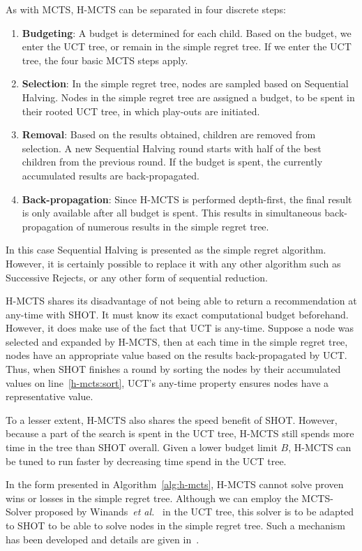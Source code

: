 \documentclass[a4paper]{llncs}
\begin{document}
As with MCTS, H-MCTS can be separated in four discrete steps:
\begin{enumerate}
\item \textbf{Budgeting}: A budget is determined for each child. Based on the budget, we enter the UCT tree, or remain in the simple regret tree. If we enter the UCT tree, the four basic MCTS steps apply.
\item \textbf{Selection}: In the simple regret tree, nodes are sampled based on Sequential Halving. Nodes in the simple regret tree are assigned a budget, to be spent in their rooted UCT tree, in which play-outs are initiated.
\item \textbf{Removal}: Based on the results obtained, children are removed from selection. A new Sequential Halving round starts with half of the best children from the previous round. If the budget is spent, the currently accumulated results are back-propagated.
\item \textbf{Back-propagation}: Since H-MCTS is performed depth-first, the final result is only available after all budget is spent. This results in simultaneous back-propagation of numerous results in the simple regret tree.
\end{enumerate}
In this case Sequential Halving is presented as the simple regret algorithm. However, it is certainly possible to replace it with any other algorithm such as Successive Rejects, or any other form of sequential reduction.

H-MCTS shares its disadvantage of not being able to return a recommendation at any-time with SHOT. It must know its exact computational budget beforehand. However, it does make use of the fact that UCT is any-time. Suppose a node was selected and expanded by H-MCTS, then at each time in the simple regret tree, nodes have an appropriate value based on the results back-propagated by UCT. Thus, when SHOT finishes a round by sorting the nodes by their accumulated values on line~\ref{h-mcts:sort}, UCT's any-time property ensures nodes have a representative value.

To a lesser extent, H-MCTS also shares the speed benefit of SHOT. However, because a part of the search is spent in the UCT tree, H-MCTS still spends more time in the tree than SHOT overall. Given a lower budget limit $B$, H-MCTS can be tuned to run faster by decreasing time spend in the UCT tree.

In the form presented in Algorithm~\ref{alg:h-mcts}, H-MCTS cannot solve proven wins or losses in the simple regret tree. Although we can employ the MCTS-Solver proposed by Winands~\emph{et al.}~\cite{Winands2008} in the UCT tree, this solver is to be adapted to SHOT to be able to solve nodes in the simple regret tree. Such a mechanism has been developed and details are given in~\cite{pepels14novel}.
\end{document}

